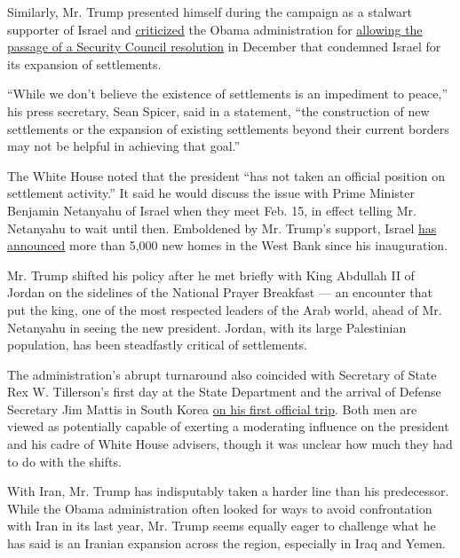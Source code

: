 Similarly, Mr. Trump presented himself during the campaign as a stalwart
supporter of Israel and
\href{https://www.nytimes.com/2016/12/22/world/middleeast/donald-trump-united-nations-israel-settlements.html}{criticized}
the Obama administration for
\href{https://www.nytimes.com/2016/12/23/world/middleeast/israel-settlements-un-vote.html}{allowing
the passage of a Security Council resolution} in December that condemned
Israel for its expansion of settlements.

``While we don't believe the existence of settlements is an impediment
to peace,'' his press secretary, Sean Spicer, said in a statement, ``the
construction of new settlements or the expansion of existing settlements
beyond their current borders may not be helpful in achieving that
goal.''

The White House noted that the president ``has not taken an official
position on settlement activity.'' It said he would discuss the issue
with Prime Minister Benjamin Netanyahu of Israel when they meet Feb. 15,
in effect telling Mr. Netanyahu to wait until then. Emboldened by Mr.
Trump's support, Israel
\href{https://www.nytimes.com/2017/02/01/world/middleeast/israel-3000-homes-west-bank.html}{has
announced} more than 5,000 new homes in the West Bank since his
inauguration.

Mr. Trump shifted his policy after he met briefly with King Abdullah II
of Jordan on the sidelines of the National Prayer Breakfast --- an
encounter that put the king, one of the most respected leaders of the
Arab world, ahead of Mr. Netanyahu in seeing the new president. Jordan,
with its large Palestinian population, has been steadfastly critical of
settlements.

The administration's abrupt turnaround also coincided with Secretary of
State Rex W. Tillerson's first day at the State Department and the
arrival of Defense Secretary Jim Mattis in South Korea
\href{https://www.nytimes.com/2017/02/02/world/asia/james-mattis-us-korea-thaad.html}{on
his first official trip}. Both men are viewed as potentially capable of
exerting a moderating influence on the president and his cadre of White
House advisers, though it was unclear how much they had to do with the
shifts.

With Iran, Mr. Trump has indisputably taken a harder line than his
predecessor. While the Obama administration often looked for ways to
avoid confrontation with Iran in its last year, Mr. Trump seems equally
eager to challenge what he has said is an Iranian expansion across the
region, especially in Iraq and Yemen.

